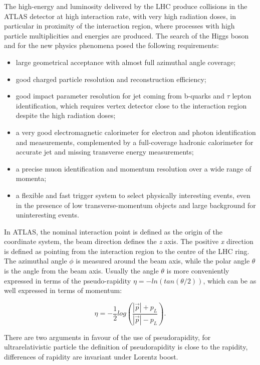 The high-energy and luminosity delivered by the LHC produce collisions in the ATLAS detector at high interaction rate, with very high radiation doses, in particular in proximity of the interaction region, where processes with high particle multiplicities and energies are produced. The search of the Higgs boson and for the new physics phenomena posed the following requirements:

\begin{itemize}
\item large geometrical acceptance with almost full azimuthal angle coverage;
\item good charged particle resolution and reconstruction efficiency;
\item good impact parameter resolution for jet coming from b-quarks and $\tau$ lepton identification, which requires vertex detector close to the interaction region despite the high radiation doses;
\item a very good electromagnetic calorimeter for electron and photon identification and measurements, complemented by a full-coverage hadronic calorimeter for accurate jet and missing transverse energy measurements;
\item  a precise muon identification and momentum resolution over a wide range of momenta;
\item a flexible and fast trigger system to select physically interesting events, even in the presence of low transverse-momentum objects and large background for uninteresting events.
\end{itemize}

In ATLAS, the nominal interaction point is defined as the origin of the coordinate system, the beam direction defines the \textit{z} axis. The positive \textit{x} direction is defined as pointing from the interaction region to the centre of the LHC ring.
The azimuthal angle $\phi$ is measured around the beam axis, while the polar angle $\theta$ is the angle from the beam axis. Usually the angle $\theta$ is more conveniently expressed in terms of the pseudo-rapidity $\eta = -ln(tan(\theta /2))$, which can be as well expressed in terms of momentum:

\begin{equation}
\label{eq:pseudorapidity}
 \eta = -\frac{1}{2}log(\frac{|\overrightarrow{p}|+p_L}{|\overrightarrow{p}|-p_L}).
\end{equation}

There are two arguments in favour of the use of pseudorapidity, for ultrarelativistic particle the definition of pseudorapidity is close to the rapidity, differences of rapidity are invariant under Lorentz boost.

